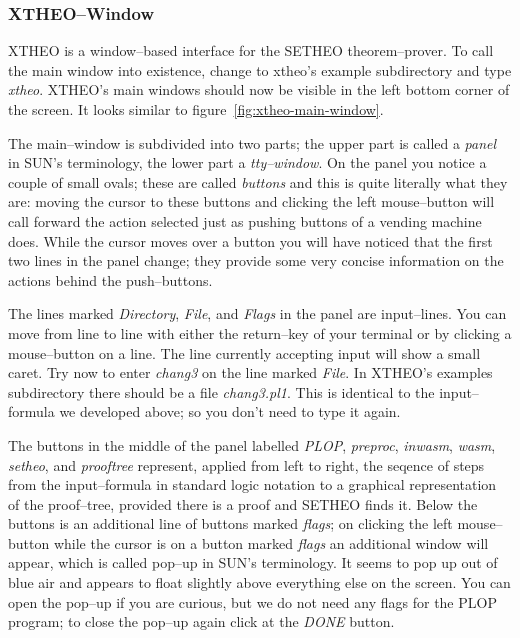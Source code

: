 \subsubsection{XTHEO--Window} 
XTHEO is a window--based interface for the SETHEO theorem--prover. To call the main window into existence,
change to xtheo's example subdirectory and type {\it xtheo\/}. XTHEO's main windows should now be visible
in the left bottom corner of the screen. It looks similar to figure~\ref{fig:xtheo-main-window}.
%


The main--window is subdivided into two parts; the upper part is called a {\it panel\/} in SUN's terminology,
the lower part a {\it tty--window\/}. On the panel you notice a couple of small ovals; these are called
{\it buttons\/} and this is quite literally what they are: moving the cursor to these buttons and clicking
the left mouse--button will call forward the action selected just as pushing buttons of a vending
machine does. 
While the cursor moves over a button you will have noticed that the first two lines in the panel change;
they provide some very concise information on the actions behind the push--buttons.

The lines marked {\it Directory\/}, {\it File\/}, and {\it Flags\/} in the panel are input--lines.
You can move from line to line with either the return--key of your terminal or by clicking a
mouse--button on a line. The line currently accepting input will show a small caret. 
Try now to enter {\it chang3\/} on the line marked {\it File\/}.
In XTHEO's examples subdirectory there should be a file {\it chang3.pl1\/}. This is identical to
the input--formula we developed above; so you don't need to type it again.

The buttons in the middle of the panel labelled {\it PLOP\/}, {\it preproc\/}, {\it inwasm\/}, {\it wasm\/}, {\it setheo\/}, and
{\it prooftree\/} represent, applied from left to right, the seqence of steps from the 
input--formula in standard logic notation to a graphical representation of the proof--tree, provided 
there is a proof and SETHEO finds it. Below the buttons is an additional line of buttons
marked {\it flags\/}; on clicking the left mouse--button while the cursor is on a button marked {\it flags\/}
an additional window will appear, which is called pop--up in SUN's terminology.
It seems to pop up out of blue air and appears to float slightly above everything else
on the screen.
You can open the pop--up if you are curious, but we do not need any flags for the PLOP program;
to close the pop--up again click at the {\it DONE\/} button. 
